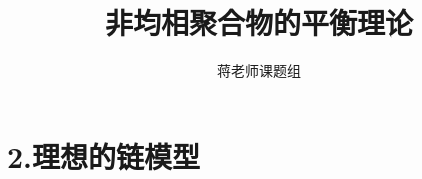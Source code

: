 \documentclass[12pt,a4paper]{article}
\title{非均相聚合物的平衡理论}
\author{蒋老师课题组}
\date{\chntoday}
\begin{document}
\maketitle
\section{2.理想的链模型}







\cite{tam19912d}

\end{document}
